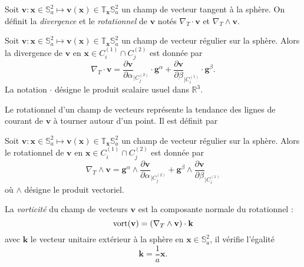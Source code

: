 Soit $\mathbf{v} : \mathbf{x} \in \mathbb{S}_a^2 \mapsto \mathbf{v}(\mathbf{x}) \in \mathbb{T}_{\mathbf{x}} \mathbb{S}_a^2$ un champ de vecteur tangent à la sphère. On définit la \textit{divergence} et le \textit{rotationnel} de $\mathbf{v}$ notés $\nabla_T \cdot \mathbf{v}$ et $\nabla_T \wedge \mathbf{v}$.

\begin{definition}
Soit $\mathbf{v} : \mathbf{x} \in \mathbb{S}_a^2 \mapsto \mathbf{v}(\mathbf{x}) \in \mathbb{T}_{\mathbf{x}} \mathbb{S}_a^2$ un champ de vecteur régulier sur la sphère. Alors la divergence de $\mathbf{v}$ en $\mathbf{x} \in C_i^{(1)} \cap C_j^{(2)}$ est donnée par
\begin{equation}
\nabla_T \cdot \mathbf{v} = \dfrac{\partial \mathbf{v}}{\partial \alpha}_{|C^{(2)}_j} \cdot \mathbf{g}^{\alpha} + \dfrac{\partial \mathbf{v}}{\partial \beta}_{|C^{(1)}_i} \cdot \mathbf{g}^{\beta}.
\end{equation}
\label{def:divergence}
La notation $\cdot$ désigne le produit scalaire usuel dans $\mathbb{R}^3$.
\end{definition}
Le rotationnel d'un champ de vecteurs représente la tendance des lignes de courant de $\mathbf{v}$ à tourner autour d'un point. Il est définit par

\begin{definition}
Soit $\mathbf{v} : \mathbf{x} \in \mathbb{S}_a^2 \mapsto \mathbf{v}(\mathbf{x}) \in \mathbb{T}_{\mathbf{x}} \mathbb{S}_a^2$ un champ de vecteur régulier sur la sphère. Alors le rotationnel de $\mathbf{v}$ en $\mathbf{x} \in C_i^{(1)} \cap C_j^{(2)}$ est donnée par
\begin{equation}
\nabla_T \wedge \mathbf{v} =  \mathbf{g}^{\alpha} \wedge \dfrac{\partial \mathbf{v}}{\partial \alpha}_{|C^{(2)}_j} + \mathbf{g}^{\beta} \wedge \dfrac{\partial \mathbf{v}}{\partial \beta}_{|C^{(1)}_i}
\end{equation}
où $\wedge$ désigne le produit vectoriel.
\label{def:rotationnel}
\end{definition}
La \textit{vorticité} du champ de vecteurs $\mathbf{v}$ est la composante normale du rotationnel :
\begin{equation}
\text{vort} ( \mathbf{v} ) = \left( \nabla_T \wedge \mathbf{v} \right) \cdot \mathbf{k}
\label{eq:vorticité}
\end{equation}
avec $\mathbf{k}$ le vecteur unitaire extérieur à la sphère en $\mathbf{x} \in \mathbb{S}_a^2$, il vérifie l'égalité
\begin{equation}
\mathbf{k} = \dfrac{1}{a} \mathbf{x}.
\end{equation}

